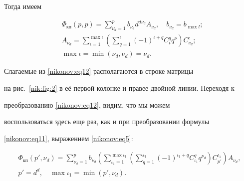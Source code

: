 Тогда имеем

\begin{equation}

\label{nikonov:eq12}

\begin{aligned}

&\Phi_{\text{кп}}(p,p)=\sum \limits_{\nu_d=1}^{p}

b_{\nu_d} d^{d\nu_d}A_{\nu_d}, \quad b_{\nu_d}=b_{\max l};\\

&A_{\nu_d}= \sum \limits_{\iota=1}^{\max \iota} \left( \sum

\limits_{q=1}^\iota (-1)^{\iota+q} C^q_\iota q^\nu \right)

C^\iota_{\nu_d};\\

&\max \iota = \min(\nu_d, \nu_d)=\nu_d.

\end{aligned}

\end{equation}



Слагаемые из \eqref{nikonov:eq12} располагаются в строке матрицы

на рис.~\ref{nik:fig:2} в её первой колонке и правее двойной линии. Переходя к

преобразованию \eqref{nikonov:eq12}, видим, что мы можем

воспользоваться здесь еще раз, как и при преобразовании формулы

\eqref{nikonov:eq11}, выражением \eqref{nikonov:eq5}:

\begin{equation}

\label{nikonov:eq13}

\begin{array}{c}

\displaystyle \Phi_{\text{кп}} (p',\nu_d)=\sum \limits_{\nu_d=1}^p b_{\nu_d} \left(\sum \limits_{\iota_1=1}^{\max \iota_1}

\left(\sum \limits_{q=1}^{\iota_1} (-1)^{\iota_1+q}C^q_{\iota_1} q^{\nu_d}\right) C^{\iota_1}_{p'} \right) A_{\nu_d}, \\

 p'=d^d, \quad \max \iota_1=\min \left(p',\nu_d \right).

\end{array}

\end{equation}



